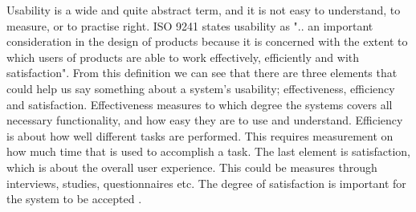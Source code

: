 Usability is a wide and quite abstract term, and it is not easy to understand, to measure, or to practise right. ISO 9241 states usability as ".. an important consideration in the design of products because it is concerned with the extent to which users of products are able to work effectively, efficiently and with satisfaction"\cite{usabilitydef}. From this definition we can see that there are three elements that could help us say something about a system's usability; effectiveness, efficiency and satisfaction. Effectiveness measures to which degree the systems covers all necessary functionality, and how easy they are to use and understand. Efficiency is about how well different tasks are performed. This requires measurement on how much time that is used to accomplish a task. The last element is satisfaction, which is about the overall user experience. This could be measures through interviews, studies, questionnaires etc. The degree of satisfaction is important for the system to be accepted \cite{mmi}. 

